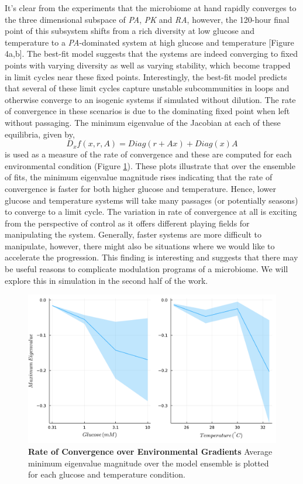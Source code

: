 \documentclass[twocolumn, 10pt]{report}
\begin{document}
{It's clear from the experiments that the microbiome at hand rapidly converges to the three dimensional subspace of \textit{PA}, \textit{PK} and \textit{RA}, however, the 120-hour final point of this subsystem shifts from a rich diversity at low glucose and temperature to a \textit{PA}-dominated system at high glucose and temperature [Figure 4a,b]. The best-fit model suggests that the systems are indeed converging to fixed points with varying diversity as well as varying stability, which become trapped in limit cycles near these fixed points. Interestingly, the best-fit model predicts that several of these limit cycles capture unstable subcommunities in loops and otherwise converge to an isogenic systems if simulated without dilution. The rate of convergence in these scenarios is due to the dominating fixed point when left without passaging. The minimum eigenvalue of the Jacobian at each of these equilibria, given by,
\begin{equation} \label{jacob}
    D_{x}f(x,r,A) = Diag(r + Ax) + Diag(x)A
\end{equation}
is used as a measure of the rate of convergence and these are computed for each environmental condition (Figure \ref{fig:roc}). These plots illustrate that over the ensemble of fits, the minimum eigenvalue magnitude rises indicating that the rate of convergence is faster for both higher glucose and temperature. Hence, lower glucose and temperature systems will take many passages (or potentially seasons) to converge to a limit cycle. The variation in rate of convergence at all is exciting from the perspective of control as it offers different playing fields for manipulating the system. Generally, faster systems are more difficult to manipulate, however, there might also be situations where we would like to accelerate the progression. This finding is interesting and suggests that there may be useful reasons to complicate modulation programs of a microbiome. We will explore this in simulation in the second half of the work.

\begin{figure}[!ht]
    \centering
    \includegraphics[width=1.0\columnwidth]{figs/ROC_change.pdf}
    \centering
    \caption{\textbf{Rate of Convergence over Environmental Gradients} Average minimum eigenvalue magnitude over the model ensemble is plotted for each glucose and temperature condition.}\label{fig:roc}
\end{figure}

}
\end{document}
